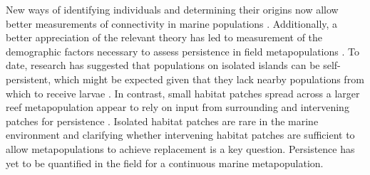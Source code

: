 \documentclass[12pt, oneside]{article}   	%
\begin{document}

New ways of identifying individuals and determining their origins now allow better measurements of connectivity in marine populations \citep{almany2017larval, daloia_self-recruitment_2013}. Additionally, a better appreciation of the relevant theory has led to measurement of the demographic factors necessary to assess persistence in field metapopulations \citep{carson2011evaluating, hameed2016inverse, johnson2018integrating, salles_coral_2015}. To date, research has suggested that populations on isolated islands can be self-persistent, which might be expected given that they lack nearby populations from which to receive larvae \citep{salles_coral_2015}. In contrast, small habitat patches spread across a larger reef metapopulation appear to rely on input from surrounding and intervening patches for persistence \citep{johnson2018integrating}. Isolated habitat patches are rare in the marine environment and clarifying whether intervening habitat patches are sufficient to allow metapopulations to achieve replacement is a key question. Persistence has yet to be quantified in the field for a continuous marine metapopulation. 

\end{document}
